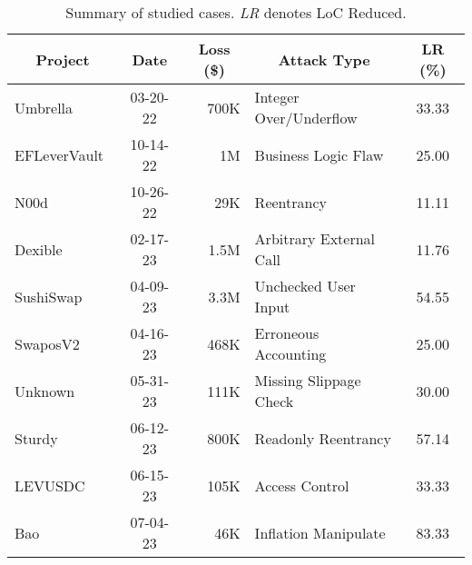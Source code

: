 \begin{table}[t]
\centering
\caption{Summary of studied cases. \textit{LR} denotes LoC Reduced.}
\vspace{-1mm}
\small
\setlength{\tabcolsep}{2.5pt}
\label{tab:case}
\begin{tabular}{lcrlc}
\toprule
\multicolumn{1}{c}{\textbf{Project}} & \textbf{Date}     & \multicolumn{1}{c}{\textbf{Loss} (\$)} & \multicolumn{1}{c}{\textbf{Attack Type}} & \multicolumn{1}{c}{\textbf{LR}  (\%)} \\
\midrule
Umbrella~\cite{unbrellaHack}                    & 03-20-22 & 700K                     & Integer Over/Underflow                & 33.33                           \\
EFLeverVault~\cite{eflevervaultHack}                & 10-14-22 & 1M                       & Business Logic Flaw    & 25.00                           \\
N00d~\cite{n00dHack}                        & 10-26-22 & 29K                      & Reentrancy                      & 11.11                           \\
Dexible~\cite{dexibleHack}                     & 02-17-23 & 1.5M                     & Arbitrary External Call         & 11.76                           \\
SushiSwap~\cite{sushiSwapHack}                   & 04-09-23 & 3.3M                     & Unchecked User Input            & 54.55                           \\
SwaposV2~\cite{swaposv2Hack}                    & 04-16-23 & 468K                     & Erroneous Accounting            & 25.00                           \\
Unknown~\cite{unknownHack}               & 05-31-23 & 111K                     & Missing Slippage Check          & 30.00                           \\
Sturdy~\cite{sturbyHack}                      & 06-12-23 & 800K                     & Readonly Reentrancy            & 57.14                           \\
LEVUSDC~\cite{levusdcHack}                     & 06-15-23 & 105K                     & Access Control                  & 33.33                           \\
Bao~\cite{baoHack}                & 07-04-23 & 46K                      & Inflation Manipulate            & 83.33    \\
\bottomrule
\end{tabular}
\end{table}

